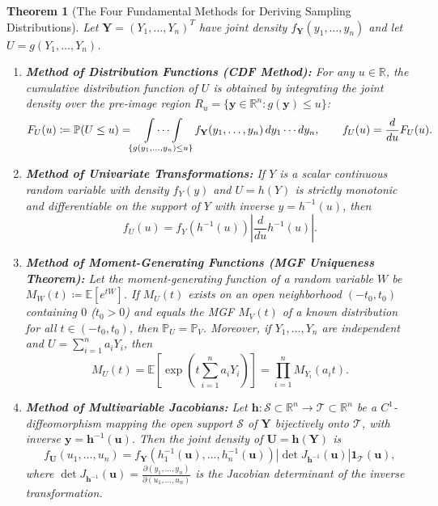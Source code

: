 \documentclass[11pt, letterpaper]{article}
\newtheorem{theorem}{Theorem}[section]
\theoremstyle{definition}
\theoremstyle{remark}
\newcommand{\R}{\mathbb{R}}
\newcommand{\E}{\mathbb{E}}
\newcommand{\Prob}{\mathbb{P}}
\begin{document}
\begin{theorem}[The Four Fundamental Methods for Deriving Sampling Distributions]
Let $\mathbf{Y} = (Y_1, \dots, Y_n)^T$ have joint density $f_{\mathbf{Y}}(y_1, \dots, y_n)$ and let $U = g(Y_1, \dots, Y_n)$.
\begin{enumerate}[label=\textbf{\arabic*.}]
    \item \textbf{Method of Distribution Functions (CDF Method):} For any $u \in \R$, the cumulative distribution function of $U$ is obtained by integrating the joint density over the pre-image region $R_u = \{\mathbf{y} \in \R^n : g(\mathbf{y}) \le u\}$:
    \[
        F_U(u) \coloneqq \Prob(U \le u) = \idotsint\limits_{\{g(y_1, \dots, y_n) \le u\}} f_{\mathbf{Y}}(y_1, \dots, y_n) \, dy_1 \cdots dy_n, \qquad f_U(u) = \frac{d}{du} F_U(u).
    \]
    \item \textbf{Method of Univariate Transformations:} If $Y$ is a scalar continuous random variable with density $f_Y(y)$ and $U = h(Y)$ is strictly monotonic and differentiable on the support of $Y$ with inverse $y = h^{-1}(u)$, then
    \[
        f_U(u) = f_Y\left(h^{-1}(u)\right) \left|\frac{d}{du} h^{-1}(u)\right|.
    \]
    \item \textbf{Method of Moment-Generating Functions (MGF Uniqueness Theorem):} Let the moment-generating function of a random variable $W$ be $M_W(t) \coloneqq \E[e^{tW}]$. If $M_U(t)$ exists on an open neighborhood $(-t_0, t_0)$ containing $0$ ($t_0 > 0$) and equals the MGF $M_V(t)$ of a known distribution for all $t \in (-t_0, t_0)$, then $\Prob_U = \Prob_V$. Moreover, if $Y_1, \dots, Y_n$ are independent and $U = \sum_{i=1}^n a_i Y_i$, then
    \[
        M_U(t) = \E\left[\exp\left(t \sum_{i=1}^{n} a_i Y_i\right)\right] = \prod_{i=1}^{n} M_{Y_i}(a_i t).
    \]
    \item \textbf{Method of Multivariable Jacobians:} Let $\mathbf{h} : \mathcal{S} \subset \R^n \to \mathcal{T} \subset \R^n$ be a $C^1$-diffeomorphism mapping the open support $\mathcal{S}$ of $\mathbf{Y}$ bijectively onto $\mathcal{T}$, with inverse $\mathbf{y} = \mathbf{h}^{-1}(\mathbf{u})$. Then the joint density of $\mathbf{U} = \mathbf{h}(\mathbf{Y})$ is
    \[
        f_{\mathbf{U}}(u_1, \dots, u_n) = f_{\mathbf{Y}}\left(h_1^{-1}(\mathbf{u}), \dots, h_n^{-1}(\mathbf{u})\right) \left|\det J_{\mathbf{h}^{-1}}(\mathbf{u})\right| \mathbf{1}_{\mathcal{T}}(\mathbf{u}),
    \]
    where $\det J_{\mathbf{h}^{-1}}(\mathbf{u}) = \frac{\partial(y_1, \dots, y_n)}{\partial(u_1, \dots, u_n)}$ is the Jacobian determinant of the inverse transformation.
\end{enumerate}
\end{theorem}
\end{document}
